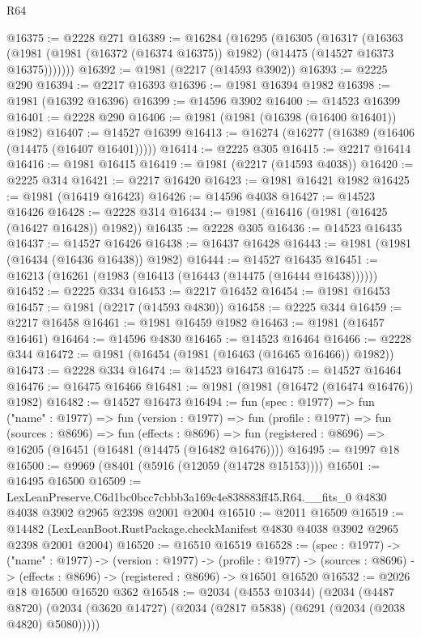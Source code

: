 \begin{lexlean}{R64}
\begin{coremodule}
@16375 := @2228 @271
@16389 := @16284
    (@16295
      (@16305
        (@16317
          (@16363 (@1981 (@1981 (@16372 (@16374 @16375)) @1982) (@14475 (@14527 @16373 @16375)))))))
@16392 := @1981 (@2217 (@14593 @3902))
@16393 := @2225 @290
@16394 := @2217 @16393
@16396 := @1981 @16394 @1982
@16398 := @1981 (@16392 @16396)
@16399 := @14596 @3902
@16400 := @14523 @16399
@16401 := @2228 @290
@16406 := @1981 (@1981 (@16398 (@16400 @16401)) @1982)
@16407 := @14527 @16399
@16413 := @16274 (@16277 (@16389 (@16406 (@14475 (@16407 @16401)))))
@16414 := @2225 @305
@16415 := @2217 @16414
@16416 := @1981 @16415
@16419 := @1981 (@2217 (@14593 @4038))
@16420 := @2225 @314
@16421 := @2217 @16420
@16423 := @1981 @16421 @1982
@16425 := @1981 (@16419 @16423)
@16426 := @14596 @4038
@16427 := @14523 @16426
@16428 := @2228 @314
@16434 := @1981 (@16416 (@1981 (@16425 (@16427 @16428)) @1982))
@16435 := @2228 @305
@16436 := @14523 @16435
@16437 := @14527 @16426
@16438 := @16437 @16428
@16443 := @1981 (@1981 (@16434 (@16436 @16438)) @1982)
@16444 := @14527 @16435
@16451 := @16213 (@16261 (@1983 (@16413 (@16443 (@14475 (@16444 @16438))))))
@16452 := @2225 @334
@16453 := @2217 @16452
@16454 := @1981 @16453
@16457 := @1981 (@2217 (@14593 @4830))
@16458 := @2225 @344
@16459 := @2217 @16458
@16461 := @1981 @16459 @1982
@16463 := @1981 (@16457 @16461)
@16464 := @14596 @4830
@16465 := @14523 @16464
@16466 := @2228 @344
@16472 := @1981 (@16454 (@1981 (@16463 (@16465 @16466)) @1982))
@16473 := @2228 @334
@16474 := @14523 @16473
@16475 := @14527 @16464
@16476 := @16475 @16466
@16481 := @1981 (@1981 (@16472 (@16474 @16476)) @1982)
@16482 := @14527 @16473
@16494 := fun (spec : @1977) =>
  fun ("name" : @1977) =>
  fun (version : @1977) =>
  fun (profile : @1977) =>
  fun (sources : @8696) =>
  fun (effects : @8696) =>
  fun (registered : @8696) => @16205 (@16451 (@16481 (@14475 (@16482 @16476))))
@16495 := @1997 @18
@16500 := @9969 (@8401 (@5916 (@12059 (@14728 @15153))))
@16501 := @16495 @16500
@16509 := LexLeanPreserve.C6d1bc0bcc7cbbb3a169c4e838883ff45.R64.__fits_0
    @4830
    @4038
    @3902
    @2965
    @2398
    @2001
    @2004
@16510 := @2011 @16509
@16519 := @14482 (LexLeanBoot.RustPackage.checkManifest @4830 @4038 @3902 @2965 @2398 @2001 @2004)
@16520 := @16510 @16519
@16528 := (spec : @1977) ->
  ("name" : @1977) ->
  (version : @1977) ->
  (profile : @1977) ->
  (sources : @8696) -> (effects : @8696) -> (registered : @8696) -> @16501 @16520
@16532 := @2026 @18 @16500 @16520 @362
@16548 := @2034
    (@4553 @10344)
    (@2034
      (@4487 @8720)
      (@2034 (@3620 @14727) (@2034 (@2817 @5838) (@6291 (@2034 (@2038 @4820) @5080)))))

\end{coremodule}
\end{lexlean}
